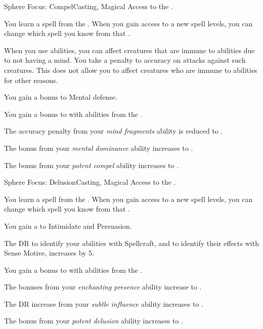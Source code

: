     \begin{feat}{Sphere Focus: Compel}{Casting, Magical}
        \featpre Access to the  .

         You learn a spell from the  .
        When you gain access to a new spell levels, you can change which spell you know from that .

         When you use  abilities, you can affect creatures that are immune to  abilities due to not having a mind.
        You take a  penalty to accuracy on attacks against such creatures.
        This does not allow you to affect creatures who are immune to  abilities for other reasons.

         You gain a  bonus to Mental defense.

         You gain a  bonus to  with abilities from the  . 

         The accuracy penalty from your \textit{mind fragments} ability is reduced to .

         The bonus from your \textit{mental dominance} ability increases to .

         The bonus from your \textit{potent compel} ability increases to .
    \end{feat}

    \begin{feat}{Sphere Focus: Delusion}{Casting, Magical}
        \featpre Access to the  .

         You learn a spell from the  .
        When you gain access to a new spell levels, you can change which spell you know from that .

         You gain a   to Intimidate and Persuasion.

         The DR to identify your  abilities with Spellcraft, and to identify their effects with Sense Motive, increases by 5.

         You gain a  bonus to  with abilities from the  . 

         The bonuses from your \textit{enchanting presence} ability increase to .

         The DR increase from your \textit{subtle influence} ability increases to .

         The bonus from your \textit{potent delusion} ability increases to .
    \end{feat}


